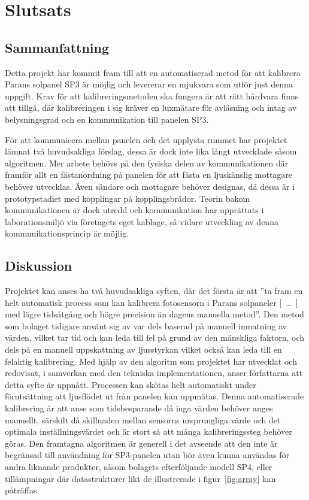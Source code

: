 \section{Slutsats} %
\label{sec:slutsats}
    \subsection{Sammanfattning} %
    \label{sub:sammanfattning}
        Detta projekt har kommit fram till att en automatiserad metod för att kalibrera Parans solpanel SP3 är möjlig och levererar en mjukvara som utför just denna uppgift. Krav för att kalibreringsmetoden ska fungera är att rätt hårdvara finns att tillgå, där kalibreringen i sig kräver en luxmätare för avläsning och intag av belysningsgrad och en kommunikation till panelen SP3.\bigskip 

        För att kommunicera mellan panelen och det upplysta rummet har projektet lämnat två huvudsakliga förslag, dessa är dock inte lika långt utvecklade såsom algoritmen. Mer arbete behövs på den fysiska delen av kommunikationen där framför allt en fästanordning på panelen för att fästa en ljuskänslig mottagare behöver utvecklas. Även sändare och mottagare behöver designas, då dessa är i prototypstadiet med kopplingar på kopplingsbrädor. Teorin bakom kommunikationen är dock utredd och kommunikation har upprättats i laborationsmiljö via företagets eget kablage, så vidare utveckling av denna kommunikationsprincip är möjlig.

    \subsection{Diskussion} %
    \label{sub:diskussion}
        Projektet kan anses ha två huvudsakliga syften, där det första är att ''ta fram en helt automatisk process som kan kalibrera fotosensorn i Parans solpaneler [~\dots~] med lägre tidsåtgång och högre precision än dagens manuella metod''. 
        Den metod som bolaget tidigare använt sig av var dels baserad på manuell inmatning av värden, vilket tar tid och kan leda till fel på grund av den mänskliga faktorn, och dels på en manuell uppskattning av ljusstyrkan vilket också kan leda till en felaktig kalibrering. 
        Med hjälp av den algoritm som projektet har utvecklat och redovisat, i samverkan med den tekniska implementationen, anser författarna att detta syfte är uppnått. Processen kan skötas helt automatiskt under förutsättning att ljusflödet ut från panelen kan uppmätas. 
        Denna automatiserade kalibrering är att anse som tidsbesparande då inga värden behöver anges manuellt, särskilt då skillnaden mellan sensorns ursprungliga värde och det optimala inställningsvärdet och är stort så att många kalibreringssteg behöver göras. Den framtagna algoritmen är generell i det avseende att den inte är begränsad till användning för SP3-panelen utan bör även kunna användas för andra liknande produkter, såsom bolagets efterföljande modell SP4, eller tillämpningar där datastrukturer likt de illustrerade i figur~\ref{fig:array} kan påträffas.\bigskip

